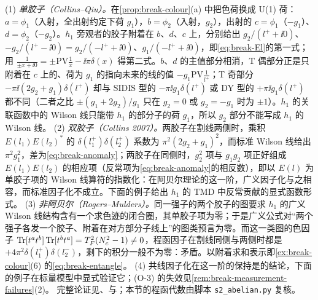 \begin{proofsketch}
(1) \emph{单胶子（Collins--Qiu）。}在\cref{prop:break-colour}(a) 中把色荷换成 U(1) 荷：$a=\phi_1$（入射，全出射约定下荷 $g_1$），$b=\phi_2$（入射，$g_2$），出射的 $c=\phi_1$（$-g_1$）、$d=\phi_2$（$-g_2$）。$h_1$ 旁观者的胶子附着在 $b$、$d$、$c$ 上，分别给出 $g_2/(l^++\ii0)$、$-g_2/(l^+-\ii0)=g_2/(-l^++\ii0)$、$g_1/(-l^++\ii0)$，即\cref{eq:break-El}的第一式；用 $\frac1{\pm x+\ii0}=\pm\mathrm{PV}\frac1x-\ii\pi\delta(x)$ 得第二式。$b$、$d$ 的主值部分相消，T 偶部分正是只附着在 $c$ 上的、荷为 $g_1$ 的指向未来的线的值 $-g_1\mathrm{PV}\frac1{l^+}$；T 奇部分 $-\pi\ii(2g_2+g_1)\delta(l^+)$ 却与 SIDIS 型的 $-\pi\ii g_1\delta(l^+)$ 或 DY 型的 $+\pi\ii g_1\delta(l^+)$ 都不同（二者之比 $\pm(g_1+2g_2)/g_1$ 只在 $g_2=0$ 或 $g_2=-g_1$ 时为 $\pm1$）。$h_1$ 的关联函数中的 Wilson 线只能带 $h_1$ 的部分子的荷 $g_1$，所以 $g_2$ 部分不能写成 $h_1$ 的 Wilson 线\cite{CollinsQiu2007}。
(2) \emph{双胶子（Collins 2007）。}两胶子在割线两侧时，乘积 $E(l_1)E(l_2)^*$ 的 $\delta(l_1^+)\delta(l_2^+)$ 系数为 $\pi^2(2g_2+g_1)^2$，而标准 Wilson 线给出 $\pi^2g_1^2$，差为\cref{eq:break-anomaly}；两胶子在同侧时，$g_2^2$ 项与 $g_1g_2$ 项正好组成 $E(l_1)E(l_2)$ 的相应项（反常项为\cref{eq:break-anomaly}的相反数），即以 $E(l)$ 为单胶子项的 Wilson 线算符的指数化\cite[式~(7)(8)]{Collins2007}：在阿贝尔理论的这一阶，广义因子化与之相容，而标准因子化不成立。下面的例子给出 $h_1$ 的 TMD 中反常贡献的显式函数形式。
(3) \emph{非阿贝尔（Rogers--Mulders）。}同一强子的两个胶子的图要求 $h_1$ 的广义 Wilson 线结构含有一个求色迹的闭合圈，其单胶子项为零\cite[式~(30)(33)]{RogersMulders2010}；于是广义公式对“两个强子各发一个胶子、附着在对方部分子线上”的图类预言为零。而这一类图的色因子 $\operatorname{Tr}[t^at^b]\operatorname{Tr}[t^bt^a]=T_F^2(N_c^2-1)\neq0$，程函因子在割线同侧与两侧时都是 $+4\pi^2\delta(l_1^+)\delta(l_2^-)$\cite[式~(34)--(36)]{RogersMulders2010}，剩下的积分一般不为零：矛盾。以附着求和表示即\cref{ex:break-colour}(6) 的\cref{eq:break-entangle}。
(4) 共线因子化在这一阶的保持是\cite{Collins2007}的结论，下面的例子在标量模型中显式验证它；(O-3) 的失效见\cref{rem:break-measurement-failures}(2)。
完整论证见\cite[第~IV~节]{CollinsQiu2007}、\cite{Collins2007}与\cite[第~V、VI~节]{RogersMulders2010}；本节的程函代数由脚本 \texttt{s2\_abelian.py} 复核。
\end{proofsketch}

